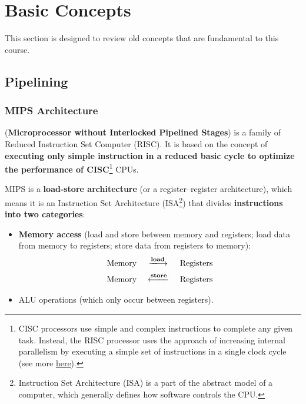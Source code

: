 \section{Basic Concepts}

This section is designed to review old concepts that are fundamental to this course.

\subsection{Pipelining}

\subsubsection{MIPS  Architecture}

 (\textbf{Microprocessor without Interlocked Pipelined Stages}) is a family of Reduced Instruction Set Computer (RISC). It is based on the concept of \textbf{executing only simple instruction in a reduced basic cycle to optimize the performance of CISC}\footnote{CISC processors use simple and complex instructions to complete any given task. Instead, the RISC processor uses the approach of increasing internal parallelism by executing a simple set of instructions in a single clock cycle (see more \href{https://electronicsdesk.com/cisc-processor.html}{here}).} CPUs.

\highspace
MIPS is a \textbf{load-store architecture} (or a register–register architecture), which means it is an Instruction Set Architecture (ISA\footnote{Instruction Set Architecture (ISA) is a part of the abstract model of a computer, which generally defines how software controls the CPU.}) that divides \textbf{instructions into two categories}: 
\begin{itemize}
    \item \textbf{Memory access} (load and store between memory and registers; load data from memory to registers; store data from registers to memory):
    \begin{equation*}
        \begin{array}{rcl}
            \text{Memory } &\xlongrightarrow{\mathbf{load}}& \text{ Registers} \\ [.5em]
            \text{Memory } &\xlongleftarrow{\mathbf{store}}& \text{ Registers}
        \end{array}
    \end{equation*}
    \item ALU operations (which only occur between registers).
\end{itemize}

